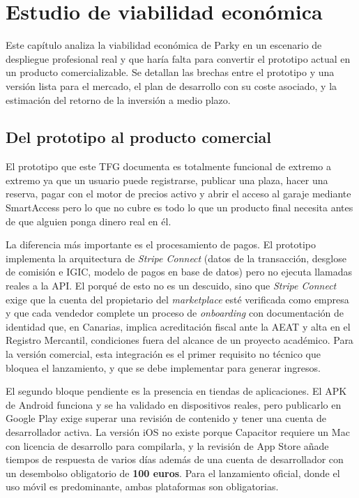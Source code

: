 \chapter{Estudio de viabilidad económica}
\label{ch:viabilidad_economica}

Este capítulo analiza la viabilidad económica de Parky en un escenario de despliegue profesional real y que haría falta para convertir el prototipo actual en un producto comercializable. Se detallan las brechas entre el prototipo y una versión lista para el mercado, el plan de desarrollo con su coste asociado, y la estimación del retorno de la inversión a medio plazo.

\section{Del prototipo al producto comercial}
\label{sec:prototipo_a_comercial}

El prototipo que este TFG documenta es totalmente funcional de extremo a extremo ya que un usuario puede registrarse, publicar una plaza, hacer una reserva, pagar con el motor de precios activo y abrir el acceso al garaje mediante SmartAccess pero lo que no cubre es todo lo que un producto final necesita antes de que alguien ponga dinero real en él.

La diferencia más importante es el procesamiento de pagos. El prototipo implementa la arquitectura de \textit{Stripe Connect} (datos de la transacción, desglose de comisión e IGIC, modelo de pagos en base de datos) pero no ejecuta llamadas reales a la API. El porqué de esto no es un descuido, sino que \textit{Stripe Connect} exige que la cuenta del propietario del \textit{marketplace} esté verificada como empresa y que cada vendedor complete un proceso de \textit{onboarding} con documentación de identidad que, en Canarias, implica acreditación fiscal ante la AEAT y alta en el Registro Mercantil, condiciones fuera del alcance de un proyecto académico. Para la versión comercial, esta integración es el primer requisito no técnico que bloquea el lanzamiento, y que se debe implementar para generar ingresos.

El segundo bloque pendiente es la presencia en tiendas de aplicaciones. El APK de Android funciona y se ha validado en dispositivos reales, pero publicarlo en Google Play exige superar una revisión de contenido y tener una cuenta de desarrollador activa. La versión iOS no existe porque Capacitor requiere un Mac con licencia de desarrollo para compilarla, y la revisión de App Store añade tiempos de respuesta de varios días además de una cuenta de desarrollador con un desembolso obligatorio de \textbf{100 euros}. Para el lanzamiento oficial, donde el uso móvil es predominante, ambas plataformas son obligatorias.

